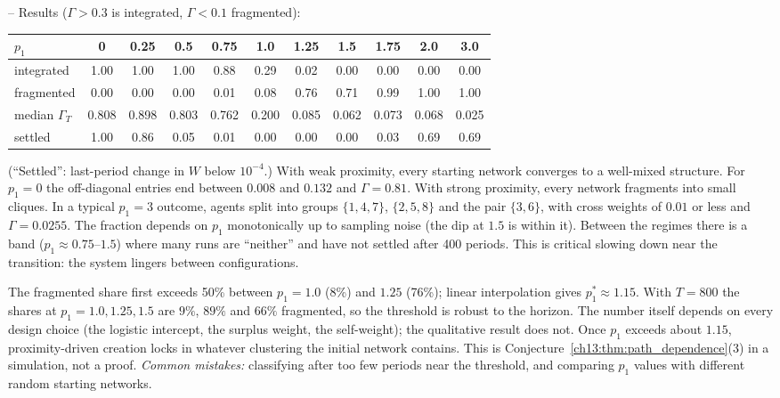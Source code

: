 \documentclass[../solutions_manual.tex]{subfiles}
\begin{document}
-- Results ($\Gamma > 0.3$ is integrated, $\Gamma < 0.1$ fragmented):
\begin{center}
\small
\begin{tabular}{lcccccccccc}
\toprule
$p_1$ & 0 & 0.25 & 0.5 & 0.75 & 1.0 & 1.25 & 1.5 & 1.75 & 2.0 & 3.0 \\
\midrule
integrated & 1.00 & 1.00 & 1.00 & 0.88 & 0.29 & 0.02 & 0.00 & 0.00 & 0.00 & 0.00 \\
fragmented & 0.00 & 0.00 & 0.00 & 0.01 & 0.08 & 0.76 & 0.71 & 0.99 & 1.00 & 1.00 \\
median $\Gamma_T$ & 0.808 & 0.898 & 0.803 & 0.762 & 0.200 & 0.085 & 0.062 & 0.073 & 0.068 & 0.025 \\
settled & 1.00 & 0.86 & 0.05 & 0.01 & 0.00 & 0.00 & 0.00 & 0.03 & 0.69 & 0.69 \\
\bottomrule
\end{tabular}
\end{center}
(``Settled'': last-period change in $W$ below $10^{-4}$.) With weak proximity, every starting network converges to a well-mixed structure. For $p_1 = 0$ the off-diagonal entries end between $0.008$ and $0.132$ and $\Gamma = 0.81$. With strong proximity, every network fragments into small cliques. In a typical $p_1 = 3$ outcome, agents split into groups $\{1,4,7\}$, $\{2,5,8\}$ and the pair $\{3,6\}$, with cross weights of $0.01$ or less and $\Gamma = 0.0255$. The fraction depends on $p_1$ monotonically up to sampling noise (the dip at $1.5$ is within it). Between the regimes there is a band ($p_1 \approx 0.75$--$1.5$) where many runs are ``neither'' and have not settled after 400 periods. This is critical slowing down near the transition: the system lingers between configurations.

 The fragmented share first exceeds 50\% between $p_1 = 1.0$ (8\%) and $1.25$ (76\%); linear interpolation gives $p_1^* \approx 1.15$. With $T = 800$ the shares at $p_1 = 1.0, 1.25, 1.5$ are $9\%$, $89\%$ and $66\%$ fragmented, so the threshold is robust to the horizon. The number itself depends on every design choice (the logistic intercept, the surplus weight, the self-weight); the qualitative result does not. Once $p_1$ exceeds about $1.15$, proximity-driven creation locks in whatever clustering the initial network contains. This is Conjecture~\ref{ch13:thm:path_dependence}(3) in a simulation, not a proof. \textit{Common mistakes:} classifying after too few periods near the threshold, and comparing $p_1$ values with different random starting networks.

\fussy
\end{document}
